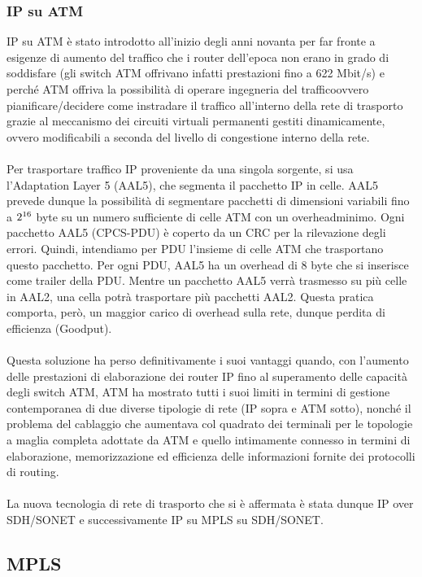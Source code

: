 \documentclass[8pt]{extarticle}
\begin{document}
\subsubsection{IP su ATM}
IP su ATM è stato introdotto all'inizio degli anni novanta per far fronte a esigenze di aumento del 
traffico che i router dell'epoca non erano in grado di soddisfare (gli switch ATM offrivano infatti 
prestazioni fino a 622 Mbit/s) e perché ATM offriva la possibilità di operare ingegneria del trafficoovvero 
pianificare/decidere come instradare il traffico all'interno della rete di trasporto grazie al meccanismo 
dei circuiti virtuali permanenti gestiti dinamicamente, ovvero modificabili a seconda del livello di 
congestione interno della rete.\\\\
Per trasportare traffico IP proveniente da una singola sorgente, si usa l'Adaptation Layer 5 (AAL5), 
che segmenta il pacchetto IP in celle. AAL5 prevede dunque la possibilità di segmentare pacchetti di 
dimensioni variabili fino a $2\textsuperscript{16}$ byte su un numero sufficiente di celle ATM con un overheadminimo. 
Ogni pacchetto AAL5 (CPCS-PDU) è coperto da un CRC per la rilevazione degli errori. Quindi, intendiamo 
per PDU l'insieme di celle ATM che trasportano questo pacchetto. Per ogni PDU, AAL5 ha un overhead di 8 
byte che si inserisce come trailer della PDU. Mentre un pacchetto AAL5 verrà trasmesso su più celle in 
AAL2, una cella potrà trasportare più pacchetti AAL2. Questa pratica comporta, però, un maggior carico 
di overhead sulla rete, dunque perdita di efficienza (Goodput).\\\\
Questa soluzione ha perso definitivamente i suoi vantaggi quando, con l'aumento delle prestazioni di 
elaborazione dei router IP fino al superamento delle capacità degli switch ATM, ATM ha mostrato tutti 
i suoi limiti in termini di gestione contemporanea di due diverse tipologie di rete (IP sopra e ATM 
sotto), nonché il problema del cablaggio che aumentava col quadrato dei terminali per le topologie 
a maglia completa adottate da ATM e quello intimamente connesso in termini di elaborazione, 
memorizzazione ed efficienza delle informazioni fornite dei protocolli di routing.\\\\
La nuova tecnologia di rete di trasporto che si è affermata è stata dunque IP over SDH/SONET e 
successivamente IP su MPLS su SDH/SONET.
\subsection{MPLS}
\end{document}
